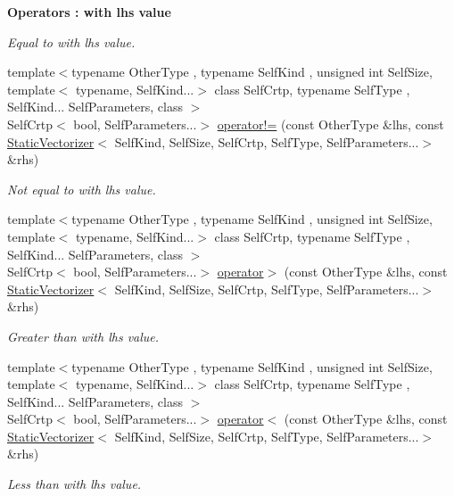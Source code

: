 \begin{Indent}{\bf Operators \-: with lhs value}
\begin{DoxyCompactItemize}
\begin{DoxyCompactList}\small\item\em Equal to with lhs value. \end{DoxyCompactList}\item 
{\footnotesize template$<$typename Other\-Type , typename Self\-Kind , unsigned int Self\-Size, template$<$ typename, Self\-Kind...$>$ class Self\-Crtp, typename Self\-Type , Self\-Kind... Self\-Parameters, class $>$ }\\Self\-Crtp$<$ bool, Self\-Parameters...$>$ \hyperlink{classmagrathea_1_1StaticVectorizer_a8bfc60393edce795fa5bd2b3bb339ef5}{operator!=} (const Other\-Type \&lhs, const \hyperlink{classmagrathea_1_1StaticVectorizer}{Static\-Vectorizer}$<$ Self\-Kind, Self\-Size, Self\-Crtp, Self\-Type, Self\-Parameters...$>$ \&rhs)
\begin{DoxyCompactList}\small\item\em Not equal to with lhs value. \end{DoxyCompactList}\item 
{\footnotesize template$<$typename Other\-Type , typename Self\-Kind , unsigned int Self\-Size, template$<$ typename, Self\-Kind...$>$ class Self\-Crtp, typename Self\-Type , Self\-Kind... Self\-Parameters, class $>$ }\\Self\-Crtp$<$ bool, Self\-Parameters...$>$ \hyperlink{classmagrathea_1_1StaticVectorizer_a1004dafefb091d626f80081672cbab19}{operator$>$} (const Other\-Type \&lhs, const \hyperlink{classmagrathea_1_1StaticVectorizer}{Static\-Vectorizer}$<$ Self\-Kind, Self\-Size, Self\-Crtp, Self\-Type, Self\-Parameters...$>$ \&rhs)
\begin{DoxyCompactList}\small\item\em Greater than with lhs value. \end{DoxyCompactList}\item 
{\footnotesize template$<$typename Other\-Type , typename Self\-Kind , unsigned int Self\-Size, template$<$ typename, Self\-Kind...$>$ class Self\-Crtp, typename Self\-Type , Self\-Kind... Self\-Parameters, class $>$ }\\Self\-Crtp$<$ bool, Self\-Parameters...$>$ \hyperlink{classmagrathea_1_1StaticVectorizer_af60adf27d2657f948be21910673c6304}{operator$<$} (const Other\-Type \&lhs, const \hyperlink{classmagrathea_1_1StaticVectorizer}{Static\-Vectorizer}$<$ Self\-Kind, Self\-Size, Self\-Crtp, Self\-Type, Self\-Parameters...$>$ \&rhs)
\begin{DoxyCompactList}\small\item\em Less than with lhs value. \end{DoxyCompactList}\item 

\end{DoxyCompactItemize}
\end{Indent}
